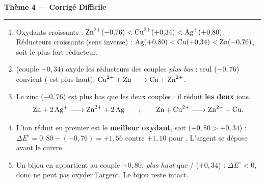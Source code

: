 \documentclass[11pt,a4paper]{article}
\begin{document}
\begin{center}
{\LARGE\bfseries\color{primarydark}Thème 4 — Corrigé Difficile}\\[-2pt]
{\color{corrcol}\rule{\textwidth}{1pt}}
\end{center}

\begin{corr}
\begin{enumerate}[label=\textbf{\alph*)},leftmargin=2.2em,topsep=2pt,itemsep=2pt]
  \item Oxydants croissants : $\ce{Zn^{2+}}(-0{,}76)<\ce{Cu^{2+}}(+0{,}34)<\ce{Ag+}(+0{,}80)$.
        Réducteurs croissants (sens inverse) : $\ce{Ag}(+0{,}80)<\ce{Cu}(+0{,}34)<\ce{Zn}(-0{,}76)$,
        soit  le plus fort réducteur.
  \item {} (couple $+0{,}34$) oxyde les réducteurs des couples \emph{plus bas} : seul 
        ($-0{,}76$) convient ( est plus haut). $\ce{Cu^{2+} + Zn -> Cu + Zn^{2+}}$.
  \item Le zinc ($-0{,}76$) est plus bas que les deux couples : il réduit \textbf{les deux} ions.
        \[
        \ce{Zn + 2 Ag+ -> Zn^{2+} + 2 Ag} \qquad ; \qquad \ce{Zn + Cu^{2+} -> Zn^{2+} + Cu}.
        \]
  \item L'ion réduit en premier est le \textbf{meilleur oxydant}, soit  ($+0{,}80>+0{,}34$) :
        $\Delta E^{\circ}=0{,}80-(-0{,}76)=+1{,}56$ contre $+1{,}10$ pour . L'argent se dépose avant le cuivre.
  \item Un bijou en  appartient au couple $+0{,}80$, \emph{plus haut} que /
        ($+0{,}34$) : $\Delta E^{\circ}<0$, donc  ne peut pas oxyder l'argent. Le bijou reste intact.
\end{enumerate}
\end{corr}
\end{document}
